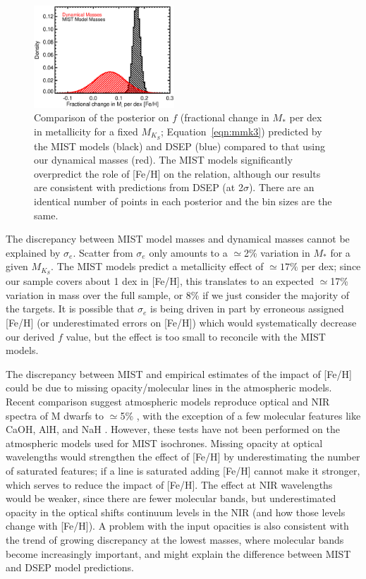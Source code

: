 \documentclass[twocolumn]{aastex62}
\newcommand{\mks}{$M_{K_S}$}
\begin{document}
\begin{figure}[htp]
\begin{center}
\includegraphics[width=0.47\textwidth]{F_plot.eps}
\caption{Comparison of the posterior on $f$ (fractional change in $M_*$ per dex in metallicity for a fixed \mks; Equation~\ref{eqn:mmk3}) predicted by the MIST models (black) and DSEP (blue) compared to that using our dynamical masses (red). The MIST models significantly overpredict the role of [Fe/H] on the relation, although our results are consistent with predictions from DSEP (at 2$\sigma$). There are an identical number of points in each posterior and the bin sizes are the same. }
\label{fig:f}
\end{center}
\end{figure}

The discrepancy between MIST model masses and dynamical masses cannot be explained by $\sigma_e$. Scatter from $\sigma_e$ only amounts to a $\simeq$2\% variation in $M_*$ for a given \mks. The MIST models predict a metallicity effect of $\simeq17\%$ per dex; since our sample covers about 1 dex in [Fe/H], this translates to an expected $\simeq$17\% variation in mass over the full sample, or 8\% if we just consider the majority of the targets. It is possible that $\sigma_e$ is being driven in part by erroneous assigned [Fe/H] (or underestimated errors on [Fe/H]) which would systematically decrease our derived $f$ value, but the effect is too small to reconcile with the MIST models. 

 The discrepancy between MIST and empirical estimates of the impact of [Fe/H] could be due to missing opacity/molecular lines in the atmospheric models. Recent comparison suggest atmospheric models reproduce optical and NIR spectra of M dwarfs to $\simeq$5\% \citep[e.g.,][]{Lepine2013,Mann2013c}, with the exception of a few molecular features like CaOH, AlH, and NaH \citep{Rajpurohit:2013}. However, these tests have not been performed on the atmospheric models used for MIST isochrones. Missing opacity at optical wavelengths would strengthen the effect of [Fe/H] by underestimating the number of saturated features; if a line is saturated adding [Fe/H] cannot make it stronger, which serves to reduce the impact of [Fe/H]. The effect at NIR wavelengths would be weaker, since there are fewer molecular bands, but underestimated opacity in the optical shifts continuum levels in the NIR (and how those levels change with [Fe/H]). A problem with the input opacities is also consistent with the trend of growing discrepancy at the lowest masses, where molecular bands become increasingly important, and might explain the difference between MIST and DSEP model predictions. 
 
\end{document}
